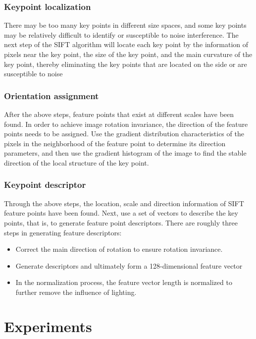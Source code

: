 \documentclass[conference]{IEEEtran}
\begin{document}
\subsubsection{Keypoint localization}
There may be too many key points in different size spaces, and some key points may be relatively difficult to identify or susceptible to noise interference. The next step of the SIFT algorithm will locate each key point by the information of pixels near the key point, the size of the key point, and the main curvature of the key point, thereby eliminating the key points that are located on the side or are susceptible to noise
\subsubsection{Orientation assignment}
After the above steps, feature points that exist at different scales have been found. In order to achieve image rotation invariance, the direction of the feature points needs to be assigned. Use the gradient distribution characteristics of the pixels in the neighborhood of the feature point to determine its direction parameters, and then use the gradient histogram of the image to find the stable direction of the local structure of the key point.
\subsubsection{Keypoint descriptor}
Through the above steps, the location, scale and direction information of SIFT feature points have been found. Next, use a set of vectors to describe the key points, that is, to generate feature point descriptors. There are roughly three steps in generating feature descriptors:
\begin{itemize}
\item Correct the main direction of rotation to ensure rotation invariance.
\item Generate descriptors and ultimately form a 128-dimensional feature vector
\item In the normalization process, the feature vector length is normalized to further remove the influence of lighting.
\end{itemize}
\section{Experiments}
\end{document}
